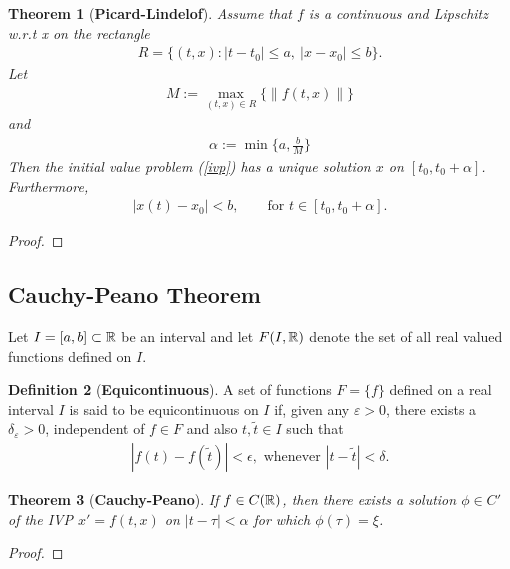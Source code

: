 \documentclass[leqno,DIV=calc,paper=a4,fontsize=11pt]{article}
\newtheorem{thm}{Theorem}[section]
\theoremstyle{definition}
\newtheorem{defn}[thm]{Definition}
\theoremstyle{plain}
\theoremstyle{remark}
\begin{document}
\begin{thm}[\textbf{Picard-Lindelof}]
Assume that $f$ is a continuous and Lipschitz w.r.t x on the rectangle
\begin{align*}
R=\{(t,x):|t-t_0|\leq a,\ |x-x_0|\leq b\}.
\end{align*}
Let
\begin{align*}
M:=\max_{(t,x)\in R}\{\|f(t,x)\|\}
\end{align*}
and
\begin{align*}
\alpha:=\min\biggl\{a,\frac{b}{M}\biggl\}
\end{align*}
Then the initial value problem (\ref{ivp}) has a unique solution $x$ on $[t_0,t_0+\alpha]$. Furthermore,
\begin{align*}
|x(t)-x_0|<b,\qquad \text{for } t\in[t_0,t_0+\alpha].
\end{align*}
\end{thm}

\begin{proof}

\end{proof}

\subsection{Cauchy-Peano Theorem}

Let $I=[a,b]\subset \Bbb R$ be an interval and let $F(I,\Bbb R)$ denote the set of all real valued functions defined on $I$.

\begin{defn}[\textbf{Equicontinuous}]
A set of functions $F = \{f\}$ defined on a real interval $I$ is said to be equicontinuous on $I$ if, given any $\varepsilon > 0$, there exists a $\delta_{\varepsilon} > 0$, independent of $f\in F$ and also $t,\widetilde{t}\in I$ such that
\begin{align*}
|f(t)-f(\widetilde{t})|<\epsilon, \text{ whenever } |t-\widetilde{t}| < \delta.
\end{align*}
\end{defn}

\begin{thm}[\textbf{Cauchy-Peano}]
If $f\in C(\Bbb R)$, then there exists a solution $\phi\in C'$ of the IVP $x'=f(t,x)$ on $|t-\tau|<\alpha$ for which $\phi(\tau)=\xi$.
\end{thm}

\begin{proof}

\end{proof}
\end{document}
